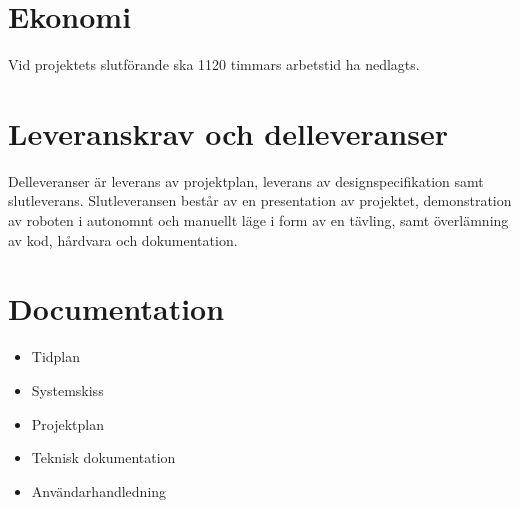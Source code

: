 \documentclass[a4paper,titlepage,12pt]{article}
\begin{document}
	\section{Ekonomi}
	Vid projektets slutförande ska 1120 timmars arbetstid ha nedlagts.

	\section{Leveranskrav och delleveranser}
	Delleveranser är leverans av projektplan, leverans av designspecifikation 
	samt slutleverans. Slutleveransen består av en presentation av projektet, 
	demonstration av roboten i autonomnt och manuellt läge i form av en tävling,
	samt överlämning av kod, hårdvara och dokumentation.
	
	\section{Documentation}
    \begin{itemize}
		\item Tidplan 
		\item Systemskiss 
		\item Projektplan
		\item Teknisk dokumentation 
		\item Användarhandledning 
    \end{itemize}
\end{document}
